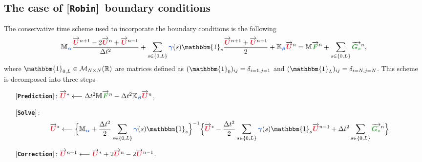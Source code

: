 \documentclass[11pt,a4paper]{article}
\newcommand{\unknown}[1]{\bm{{\color{myred}{#1}}}}
\newcommand{\param}[1]{\bm{{\color{myhyperblue}{#1}}}}
\newcommand{\data}[1]{\bm{{\color{mygreen}{#1}}}}
\newcommand{\keyword}[1]{[\texttt{\textbf{#1}}]\!\,}
\begin{document}
\subsection{The case of \keyword{Robin} boundary conditions}
The conservative time scheme used to incorporate the boundary conditions is the following
\begin{equation*}
\mathbb{M}_{\param{\alpha}}\dfrac{\overrightarrow{\unknown{U}}^{n+1} - 2\overrightarrow{\unknown{U}}^{n} + \overrightarrow{\unknown{U}}^{n-1}}{\Delta t^2} + \sum_{s\in\{0, L\}} \param{\gamma}(s)\mathbbm{1}_s \dfrac{\overrightarrow{\unknown{U}}^{n+1} + \overrightarrow{\unknown{U}}^{n-1}}{2} + \mathbb{K}_{\param{\beta}} \overrightarrow{\unknown{U}}^{n} = \mathbb{M} \overrightarrow{\data{F}}^n + \sum_{s\in\{0, L\}}  \overrightarrow{\data{G_s}}^n,
\end{equation*}
where $\mathbbm{1}_{0, L} \in \mathcal{M}_{N\times N}(\mathbb{R})$ are matrices defined as $(\mathbbm{1}_{0})_{ij} = \delta_{i=1, j=1}$ and $(\mathbbm{1}_{L})_{ij} = \delta_{i=N, j=N}$. This scheme is decomposed into three steps
\begin{itemize}
\item[] \keyword{Prediction}: $\overrightarrow{\unknown{U}}^* \longleftarrow \Delta t^2 \mathbb{M} \overrightarrow{\data{F}}^n - \Delta t^2 \mathbb{K}_{\param{\beta}} \overrightarrow{\unknown{U}}^{n}$,
\item[] \keyword{Solve}: $$\overrightarrow{\unknown{U}}^* \longleftarrow \Big\{\mathbb{M}_{\param{\alpha}} + \dfrac{\Delta t^2}{2} \sum_{s\in\{0, L\}} \param{\gamma}(s)\mathbbm{1}_s \Big\}^{-1} \Big\{\overrightarrow{\unknown{U}}^*   - \dfrac{\Delta t^2}{2} \sum_{s\in\{0, L\}} \param{\gamma}(s)\mathbbm{1}_s\overrightarrow{\unknown{U}}^{n-1} + \Delta t^2 \sum_{s\in\{0, L\}}  \overrightarrow{\data{G_s}}^n \Big\}$$
\item[] \keyword{Correction}: $\overrightarrow{\unknown{U}}^{n+1} \longleftarrow \overrightarrow{\unknown{U}}^* + 2 \overrightarrow{\unknown{U}}^n - 2 \overrightarrow{\unknown{U}}^{n-1}$.
\end{itemize}
\end{document}
